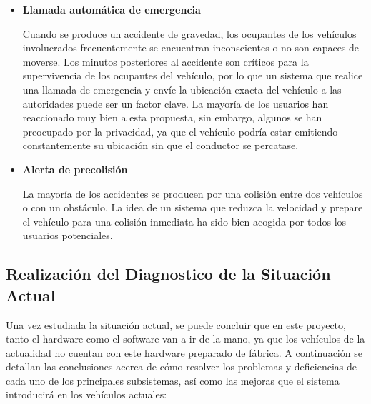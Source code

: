 \begin{itemize}[-]
\item \textbf{Llamada automática de emergencia}
\par Cuando se produce un accidente de gravedad, los ocupantes de los vehículos involucrados frecuentemente se encuentran inconscientes o no son capaces de moverse. Los minutos posteriores al accidente son críticos para la supervivencia de los ocupantes del vehículo, por lo que un sistema que realice una llamada de emergencia y envíe la ubicación exacta del vehículo a las autoridades puede ser un factor clave. La mayoría de los usuarios han reaccionado muy bien a esta propuesta, sin embargo, algunos se han preocupado por la privacidad, ya que el vehículo podría estar emitiendo constantemente su ubicación sin que el conductor se percatase.

\item \textbf{Alerta de precolisión}
\par La mayoría de los accidentes se producen por una colisión entre dos vehículos o con un obstáculo. La idea de un sistema que reduzca la velocidad y prepare el vehículo para una colisión inmediata ha sido bien acogida por todos los usuarios potenciales.


\end{itemize}

\subsection{Realización del Diagnostico de la Situación Actual}
\par Una vez estudiada la situación actual, se puede concluir que en este proyecto, tanto el hardware como el software van a ir de la mano, ya que los vehículos de la actualidad no cuentan con este hardware preparado de fábrica. A continuación se detallan las conclusiones acerca de cómo resolver los problemas y deficiencias de cada uno de los principales subsistemas, así como las mejoras que el sistema introducirá en los vehículos actuales:

